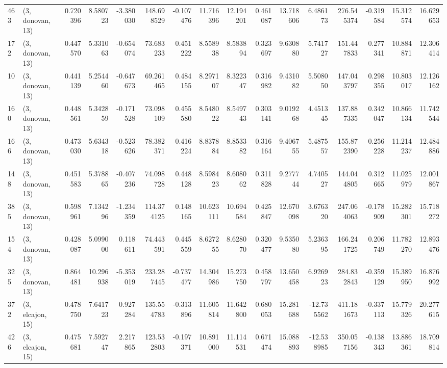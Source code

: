 \begin{tabular}{llrrrrrrrrrrrrrr}
463 &  (3, donovan, 13) &   0.720396 &   8.580723 &  -3.380030 &   148.698529 &  -0.107476 &  11.716396 &  12.194201 &  0.461087 &  13.718606 &   6.486173 &   276.545374 & -0.319584 &  15.312574 &  16.629653 \\
172 &  (3, donovan, 13) &   0.447570 &   5.331063 &  -0.654074 &    73.683233 &   0.451222 &   8.558938 &   8.583894 &  0.323697 &   9.630880 &   5.741727 &   151.447833 &  0.277341 &  10.884871 &  12.306414 \\
10  &  (3, donovan, 13) &   0.441139 &   5.254460 &  -0.647673 &    69.261465 &   0.484155 &   8.297107 &   8.322347 &  0.316982 &   9.431082 &   5.508050 &   147.043797 &  0.298355 &  10.803017 &  12.126162 \\
160 &  (3, donovan, 13) &   0.448561 &   5.342859 &  -0.171528 &    73.098109 &   0.455580 &   8.548022 &   8.549743 &  0.303141 &   9.019268 &   4.451345 &   137.887335 &  0.342047 &  10.866134 &  11.742544 \\
166 &  (3, donovan, 13) &   0.473030 &   5.634318 &  -0.523626 &    78.382371 &   0.416224 &   8.837884 &   8.853382 &  0.316164 &   9.406755 &   5.487557 &   155.872390 &  0.256228 &  11.214237 &  12.484886 \\
148 &  (3, donovan, 13) &   0.451583 &   5.378865 &  -0.407236 &    74.098728 &   0.448128 &   8.598423 &   8.608062 &  0.311828 &   9.277744 &   4.740527 &   144.044805 &  0.312665 &  11.025979 &  12.001867 \\
385 &  (3, donovan, 13) &   0.598961 &   7.134296 &  -1.234359 &   114.374125 &   0.148165 &  10.623111 &  10.694584 &  0.425847 &  12.670098 &   3.676320 &   247.064063 & -0.178909 &  15.282301 &  15.718272 \\
154 &  (3, donovan, 13) &   0.428087 &   5.099000 &   0.118611 &    74.443591 &   0.445559 &   8.627255 &   8.628070 &  0.320477 &   9.535080 &   5.236395 &   166.241725 &  0.206749 &  11.782270 &  12.893476 \\
325 &  (3, donovan, 13) &   0.864481 &  10.296938 &  -5.353019 &   233.287445 &  -0.737477 &  14.304986 &  15.273750 &  0.458797 &  13.650458 &   6.926923 &   284.832843 & -0.359129 &  15.389950 &  16.876992 \\
372 &  (3, elcajon, 15) &   0.478750 &   7.641723 &   0.927284 &   135.554783 &  -0.313896 &  11.605814 &  11.642800 &  0.680053 &  15.281688 & -12.735562 &   411.181673 & -0.337113 &  15.779326 &  20.277615 \\
426 &  (3, elcajon, 15) &   0.475681 &   7.592747 &   2.217865 &   123.532803 &  -0.197371 &  10.891000 &  11.114531 &  0.671474 &  15.088893 & -12.538985 &   350.057156 & -0.138343 &  13.886361 &  18.709814 \\

\end{tabular}

